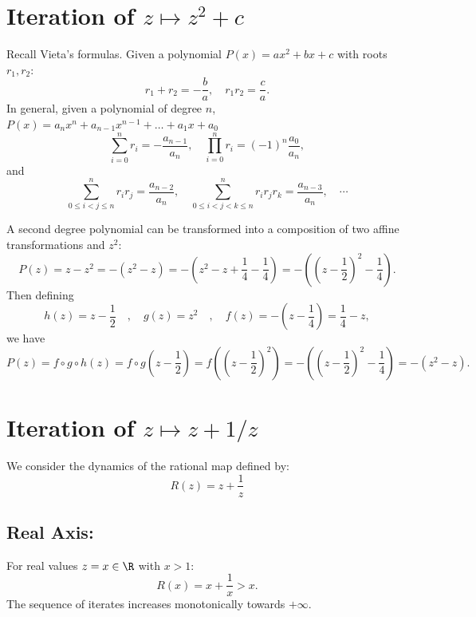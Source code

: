 \section{Iteration of $z \mapsto z^2 + c$}
Recall Vieta's formulas. Given a polynomial $P(x) = ax^2 + bx + c$ with roots
$r_1, r_2$:
\[
    r_1 + r_2 = -\frac{b}{a}, \quad r_1 r_2 = \frac{c}{a}.
\]
In general, given a polynomial of degree $n$, $P(x) = a_n x^n + a_{n-1} x^{n-1}
+ \dots + a_1 x + a_0$
\[
    \sum_{i=0}^{n} r_i = -\frac{a_{n-1}}{a_n}, \quad \prod_{i=0}^{n} r_i = (-1)^n \frac{a_0}{a_n},
\]
and
\[
    \sum_{0 \le i < j \le n}^{n} r_i r_j = \frac{a_{n-2}}{a_n}, \quad \sum_{0 \le i < j < k \le n}^{n} r_i r_j r_k = \frac{a_{n-3}}{a_n}, \quad \cdots
\]

A second degree polynomial can be transformed into a composition of two affine
transformations and $z^2$:
\[
    P(z) = z - z^2 = -(z^2 - z) = -\left(z^2 - z + \frac{1}{4} - \frac{1}{4}\right) = -\left(\left(z - \frac{1}{2}\right)^2 - \frac{1}{4}\right).
\]
Then defining
\[
    h(z) = z - \frac{1}{2} \quad , \quad g(z) = z^2 \quad , \quad f(z) = -\left(z - \frac{1}{4}\right) = \frac{1}{4} - z,
\]
we have
\[
    P(z) = f \circ g \circ h(z) = f \circ g \left(z - \frac{1}{2}\right) = f \left(\left(z - \frac{1}{2}\right)^2\right) = -\left(\left(z - \frac{1}{2}\right)^2 - \frac{1}{4}\right) = -(z^2 - z).
\]

\section{Iteration of $z \mapsto z + 1/z$}
We consider the dynamics of the rational map defined by:
\[ R(z) = z + \frac{1}{z} \]

\subsection*{Real Axis:}
For real values $z = x \in \R$ with $x > 1$:
\[
    R(x) = x + \frac{1}{x} > x.
\]
The sequence of iterates increases monotonically towards $+\infty$.

\begin{center}
\end{center}

